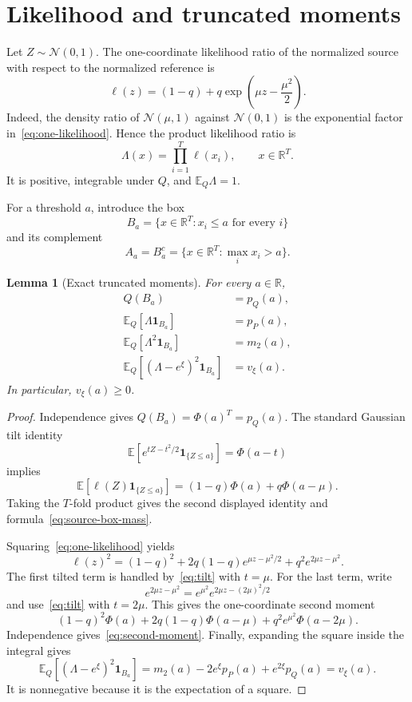 \documentclass[11pt]{article}
\newtheorem{lemma}[theorem]{Lemma}
\theoremstyle{remark}
\newcommand{\R}{\mathbb R}
\newcommand{\E}{\mathbb E}
\newcommand{\Normal}{\mathcal N}
\begin{document}
\section{Likelihood and truncated moments}

Let $Z\sim\Normal(0,1)$.  The one-coordinate likelihood ratio of the
normalized source with respect to the normalized reference is
\begin{equation}\label{eq:one-likelihood}
  \ell(z)
  =(1-q)+q\exp\!\left(\mu z-\frac{\mu^2}{2}\right).
\end{equation}
Indeed, the density ratio of $\Normal(\mu,1)$ against $\Normal(0,1)$ is the
exponential factor in~\eqref{eq:one-likelihood}.  Hence the product
likelihood ratio is
\begin{equation}\label{eq:product-likelihood}
  \Lambda(x)=\prod_{i=1}^{T}\ell(x_i),
  \qquad x\in\R^T.
\end{equation}
It is positive, integrable under $Q$, and $\E_Q\Lambda=1$.

For a threshold $a$, introduce the box
\[
  B_a=\{x\in\R^T:x_i\leq a\text{ for every }i\}
\]
and its complement
\[
  A_a=B_a^c=\{x\in\R^T:\max_i x_i>a\}.
\]

\begin{lemma}[Exact truncated moments]\label{lem:truncated-moments}
For every $a\in\R$,
\begin{align}
  Q(B_a)&=p_Q(a),\\
  \E_Q[\Lambda\mathbf 1_{B_a}]&=p_P(a),\\
  \E_Q[\Lambda^2\mathbf 1_{B_a}]&=m_2(a),\\
  \E_Q[(\Lambda-e^\xi)^2\mathbf 1_{B_a}]&=v_\xi(a).
\end{align}
In particular, $v_\xi(a)\geq0$.
\end{lemma}

\begin{proof}
Independence gives $Q(B_a)=\Phi(a)^T=p_Q(a)$.  The standard Gaussian tilt
identity
\begin{equation}\label{eq:tilt}
  \E\left[e^{tZ-t^2/2}\mathbf 1_{\{Z\leq a\}}\right]
  =\Phi(a-t)
\end{equation}
implies
\[
  \E[\ell(Z)\mathbf 1_{\{Z\leq a\}}]
  =(1-q)\Phi(a)+q\Phi(a-\mu).
\]
Taking the $T$-fold product gives the second displayed identity and
formula~\eqref{eq:source-box-mass}.

Squaring~\eqref{eq:one-likelihood} yields
\[
  \ell(z)^2
  =(1-q)^2
   +2q(1-q)e^{\mu z-\mu^2/2}
   +q^2e^{2\mu z-\mu^2}.
\]
The first tilted term is handled by~\eqref{eq:tilt} with $t=\mu$.  For the
last term, write
\[
  e^{2\mu z-\mu^2}
  =e^{\mu^2}e^{2\mu z-(2\mu)^2/2}
\]
and use~\eqref{eq:tilt} with $t=2\mu$.  This gives the one-coordinate second
moment
\[
  (1-q)^2\Phi(a)
  +2q(1-q)\Phi(a-\mu)
  +q^2e^{\mu^2}\Phi(a-2\mu).
\]
Independence gives~\eqref{eq:second-moment}.  Finally, expanding the square
inside the integral gives
\[
  \E_Q[(\Lambda-e^\xi)^2\mathbf 1_{B_a}]
  =m_2(a)-2e^\xi p_P(a)+e^{2\xi}p_Q(a)=v_\xi(a).
\]
It is nonnegative because it is the expectation of a square.
\end{proof}
\end{document}
